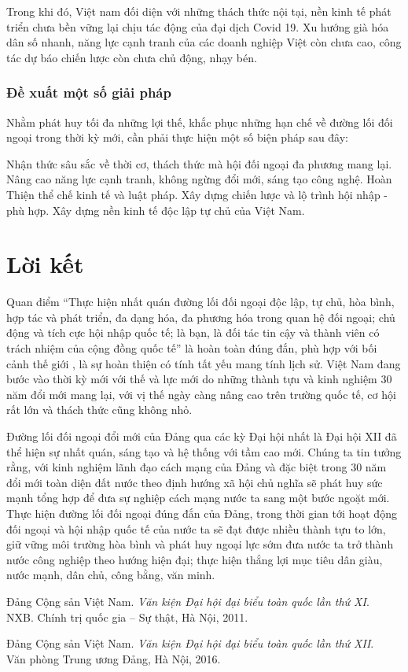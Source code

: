 \documentclass[12pt]{article}
\begin{document}
Trong khi đó, Việt nam đối diện với những thách thức nội
tại, nền kinh tế phát triển chưa bền vững lại chịu tác động
của đại dịch Covid 19. Xu hướng già hóa dân số nhanh, năng lực
cạnh tranh của các doanh nghiệp Việt còn chưa cao, công tác dự báo chiến
lược còn chưa chủ động, nhạy bén.

\subsubsection{Đề xuất một số giải pháp}
Nhằm phát huy tối đa những lợi thế, khắc phục những hạn chế về đường lối
đối ngoại trong thời kỳ mới, cần phải thực hiện một số
biện pháp sau đây:

Nhận thức sâu sắc về thời cơ, thách thức mà hội đối
ngoại đa phương mang lại. Nâng cao năng lực cạnh tranh, không
ngừng đổi mới, sáng tạo công nghệ. Hoàn Thiện thể chế kinh tế và luật pháp.
Xây dựng chiến lược và lộ trình hội nhập - phù hợp. Xây dựng nền
kinh tế độc lập tự chủ của Việt Nam.

\section{Lời kết}
Quan điểm ``Thực hiện nhất quán đường lối đối ngoại độc lập, tự chủ,
hòa bình, hợp tác và phát triển, đa dạng hóa, đa phương hóa trong quan
hệ đối ngoại; chủ động và tích cực hội nhập quốc tế; là
bạn, là đối tác tin cậy và thành viên có trách nhiệm của cộng đồng
quốc tế'' là hoàn toàn đúng đắn, phù hợp với bối cảnh thế giới , là sự hoàn
thiện có tính tất yếu mang tính lịch sử. Việt Nam đang bước vào thời kỳ mới với
thế và lực mới do những thành tựu và kinh nghiệm 30 năm đổi mới mang lại, với vị
thế ngày càng nâng cao trên trường quốc tế, cơ hội rất lớn và thách thức cũng
không nhỏ.

Đường lối đối ngoại đổi mới của Đảng qua các kỳ Đại hội nhất
là Đại hội XII đã thể hiện sự nhất quán, sáng tạo và hệ
thống với tầm cao mới. Chúng ta tin tưởng rằng, với kinh nghiệm lãnh
đạo cách mạng của Đảng và đặc biệt trong 30 năm đổi mới toàn diện
đất nước theo định hướng xã hội chủ nghĩa sẽ phát huy sức mạnh tổng
hợp để đưa sự nghiệp cách mạng nước ta sang một bước ngoặt mới. Thực
hiện đường lối đối ngoại đúng đắn của Đảng, trong thời gian tới hoạt
động đối ngoại và hội nhập quốc tế của nước ta sẽ đạt
được nhiều thành tựu to lớn, giữ vững môi trường hòa bình và phát huy
ngoại lực sớm đưa nước ta trở thành nước công nghiệp theo hướng hiện
đại; thực hiện thắng lợi mục tiêu dân giàu, nước mạnh, dân chủ, công
bằng, văn minh.

\begin{thebibliography}{9}
    Đảng Cộng sản Việt Nam.
    \textit{Văn kiện Đại hội đại biểu toàn quốc lần thứ XI}. \\
    NXB. Chính trị quốc gia – Sự thật, Hà Nội, 2011.

    Đảng Cộng sản Việt Nam.
    \textit{Văn kiện Đại hội đại biểu toàn quốc lần thứ XII}. \\
    Văn phòng Trung ương Đảng, Hà Nội, 2016.


\end{thebibliography}
\end{document}

